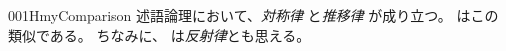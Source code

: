 \documentclass[index]{subfiles}
\begin{document}
\begin{myBlock}{001H}{myComparison}
  述語論理において、\emph{対称律}
  と\emph{推移律}
  が成り立つ。
  はこの類似である。
  ちなみに、
  は\emph{反射律}とも思える。
\end{myBlock}
\end{document}
